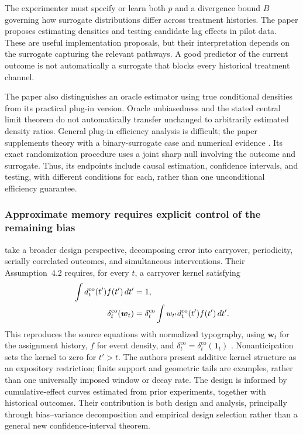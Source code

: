 The experimenter must specify or learn both $p$ and a divergence bound $B$ governing how surrogate distributions differ across treatment histories. The paper proposes estimating densities and testing candidate lag effects in pilot data. These are useful implementation proposals, but their interpretation depends on the surrogate capturing the relevant pathways. A good predictor of the current outcome is not automatically a surrogate that blocks every historical treatment channel.

The paper also distinguishes an oracle estimator using true conditional densities from its practical plug-in version. Oracle unbiasedness and the stated central limit theorem do not automatically transfer unchanged to arbitrarily estimated density ratios. General plug-in efficiency analysis is difficult; the paper supplements theory with a binary-surrogate case and numerical evidence \citep[Sections~3--5]{chen2026}. Its exact randomization procedure uses a joint sharp null involving the outcome and surrogate. Thus, its endpoints include causal estimation, confidence intervals, and testing, with different conditions for each, rather than one unconditional efficiency guarantee.

\subsubsection{Approximate memory requires explicit control of the remaining bias}

\citet{xiong2024} take a broader design perspective, decomposing error into carryover, periodicity, serially correlated outcomes, and simultaneous interventions. Their Assumption~4.2 requires, for every $t$, a carryover kernel satisfying
\begin{align}
 \int d_t^{\mathrm{co}}(t')f(t')\,dt'&=1,\notag\\
 \delta_t^{\mathrm{co}}(\boldsymbol w_t)
 &=\delta_t^{\mathrm{co}}\int w_{t'}d_t^{\mathrm{co}}(t')f(t')\,dt'.
 \label{eq:xiong-carryover-kernel}
\end{align}
This reproduces the source equations with normalized typography, using $\boldsymbol w_t$ for the assignment history, $f$ for event density, and $\delta_t^{\mathrm{co}}=\delta_t^{\mathrm{co}}(\boldsymbol1_t)$ \citep[Assumption~4.2, p.~21]{xiong2024}. Nonanticipation sets the kernel to zero for $t'>t$. The authors present additive kernel structure as an expository restriction; finite support and geometric tails are examples, rather than one universally imposed window or decay rate. The design is informed by cumulative-effect curves estimated from prior experiments, together with historical outcomes. Their contribution is both design and analysis, principally through bias--variance decomposition and empirical design selection rather than a general new confidence-interval theorem.

